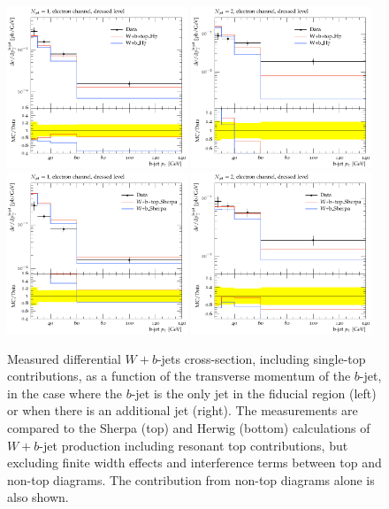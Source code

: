 \documentclass[11pt]{cernrep}
\begin{document}
\begin{figure}
\centering
	\includegraphics[width=0.48\textwidth]{unsubtracted-h7-1jet.pdf}
	\includegraphics[width=0.48\textwidth]{unsubtracted-h7-2jet.pdf}
	\includegraphics[width=0.48\textwidth]{unsubtracted-s22-1jet.pdf}
	\includegraphics[width=0.48\textwidth]{unsubtracted-s22-2jet.pdf}
\caption{\label{fig:unsubtracted}
  Measured differential $W+b$-jets cross-section, including single-top contributions, as a function of the
  transverse momentum of the $b$-jet, in the case where the $b$-jet is the only jet in the fiducial region
  (left) or when there is an additional jet (right).  The measurements
  are compared to the Sherpa (top) and Herwig (bottom)
  calculations of $W+b$-jet production including resonant top contributions, but excluding finite width effects
  and interference terms between top and non-top diagrams. The contribution from non-top diagrams alone is
  also shown.}
\end{figure}
\end{document}
